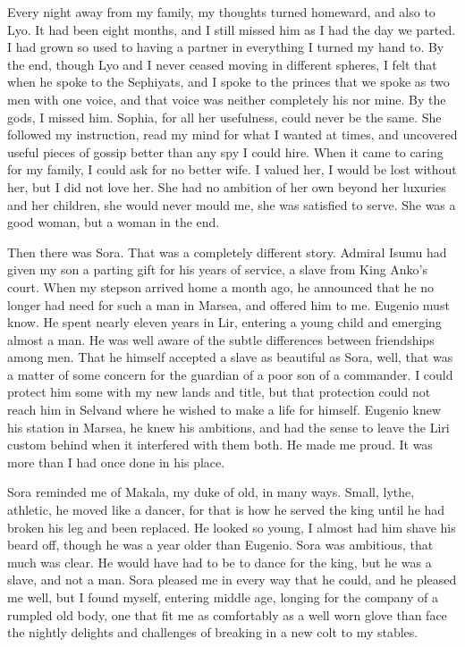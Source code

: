 \documentclass{article}
\begin{document}
Every night away from my family, my thoughts turned homeward, and also to Lyo. It had been eight months, and I still missed him as I had the day we parted. I had grown so used to having a partner in everything I turned my hand to. By the end, though Lyo and I never ceased moving in different spheres, I felt that when he spoke to the Sephiyats, and I spoke to the princes that we spoke as two men with one voice, and that voice was neither completely his nor mine. By the gods, I missed him. Sophia, for all her usefulness, could never be the same. She followed my instruction, read my mind for what I wanted at times, and uncovered useful pieces of gossip better than any spy I could hire. When it came to caring for my family, I could ask for no better wife. I valued her, I would be lost without her, but I did not love her. She had no ambition of her own beyond her luxuries and her children, she would never mould me, she was satisfied to serve. She was a good woman, but a woman in the end. 

Then there was Sora. That was a completely different story. Admiral Isumu had given my son a parting gift for his years of service, a slave from King Anko's court. When my stepson arrived home a month ago, he announced that he no longer had need for such a man in Marsea, and offered him to me. Eugenio must know. He spent nearly eleven years in Lir, entering a young child and emerging almost a man. He was well aware of the subtle differences between friendships among men. That he himself accepted a slave as beautiful as Sora, well, that was a matter of some concern for the guardian of a poor son of a commander. I could protect him some with my new lands and title, but that protection could not reach him in Selvand where he wished to make a life for himself. Eugenio knew his station in Marsea, he knew his ambitions, and had the sense to leave the Liri custom behind when it interfered with them both. He made me proud. It was more than I had once done in his place.

Sora reminded me of Makala, my duke of old, in many ways. Small, lythe, athletic, he moved like a dancer, for that is how he served the king until he had broken his leg and been replaced. He looked so young, I almost had him shave his beard off, though he was a year older than Eugenio. Sora was ambitious, that much was clear. He would have had to be to dance for the king, but he was a slave, and not a man. Sora pleased me in every way that he could, and he pleased me well, but I found myself, entering middle age, longing for the company of a rumpled old body, one that fit me as comfortably as a well worn glove than face the nightly delights and challenges of breaking in a new colt to my stables. 
\end{document}
